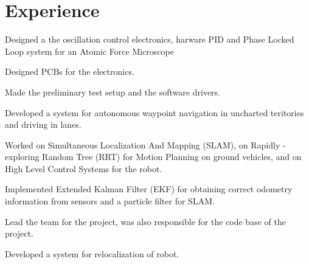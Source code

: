 \documentclass[]{deedy-resume-openfont}
\begin{document}
\hfill
\begin{minipage}[t]{0.66\textwidth} 


\section{Experience}


\vspace{\topsep} %
\begin{tightemize}\item Designed a the oscillation control electronics, harware PID and Phase Locked Loop system for an Atomic Force Microscope
\item Designed PCBs for the electronics.
\item Made the preliminary test setup and the software drivers.
\end{tightemize}
\sectionsep

\begin{tightemize}
\item Developed a system for autonomous waypoint navigation in uncharted teritories and driving in lanes.\item Worked on Simultaneous Localization And Mapping (SLAM), on Rapidly - exploring Random Tree (RRT) for Motion Planning on ground vehicles, and on High Level Control Systems for the robot.\item  Implemented Extended Kalman Filter (EKF) for obtaining correct odometry information from sensors and a particle filter for SLAM.\item Lead the team for the project, was also responsible for the code base of the project.\end{tightemize}
\sectionsep

\begin{tightemize}
\item Developed a system for relocalization of robot.
\end{tightemize}


\end{minipage}
\end{document}
